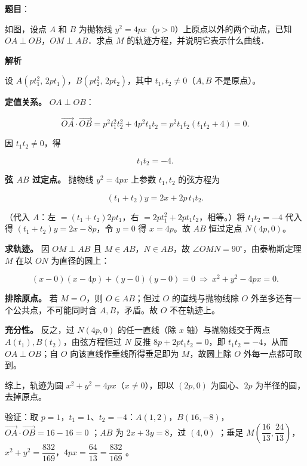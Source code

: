 \begin{answer}

\textbf{题目}：

如图，设点 $A$ 和 $B$ 为抛物线 $y^2 = 4px$（$p > 0$）上原点以外的两个动点，已知 $OA \perp OB$，$OM \perp AB$．求点 $M$ 的轨迹方程，并说明它表示什么曲线．
\nopagebreak[4]
\begin{center}\end{center}
\nopagebreak[4]
\textbf{解析}

设 $A\left(pt_1^2,\,2pt_1\right)$，$B\left(pt_2^2,\,2pt_2\right)$，其中 $t_1,t_2\ne0$（$A,B$ 不是原点）。

\textbf{定值关系。} $OA\perp OB$：

\nopagebreak[4]
\[\overrightarrow{OA}\cdot\overrightarrow{OB}=p^2t_1^2t_2^2+4p^2t_1t_2=p^2t_1t_2(t_1t_2+4)=0 .\]

因 $t_1t_2\ne0$，得

\nopagebreak[4]
\[t_1t_2=-4 .\]

\textbf{弦 $AB$ 过定点。} 抛物线 $y^2=4px$ 上参数 $t_1,t_2$ 的弦方程为

\nopagebreak[4]
\[(t_1+t_2)y=2x+2p\,t_1t_2 .\]

（代入 $A$：左 $=(t_1+t_2)2pt_1$，右 $=2pt_1^2+2pt_1t_2$，相等。）将 $t_1t_2=-4$ 代入得 $(t_1+t_2)y=2x-8p$，令 $y=0$ 得 $x=4p$。故 $AB$ 恒过定点 $N(4p,0)$。

\textbf{求轨迹。} 因 $OM\perp AB$ 且 $M\in AB$，$N\in AB$，故 $\angle OMN=90^\circ$，由泰勒斯定理 $M$ 在以 $ON$ 为直径的圆上：

\nopagebreak[4]
\[(x-0)(x-4p)+(y-0)(y-0)=0\ \Longrightarrow\ x^2+y^2-4px=0 .\]

\textbf{排除原点。} 若 $M=O$，则 $O\in AB$；但过 $O$ 的直线与抛物线除 $O$ 外至多还有一个公共点，不可能同时含 $A,B$，矛盾。故 $O$ 不在轨迹上。

\textbf{充分性。} 反之，过 $N(4p,0)$ 的任一直线（除 $x$ 轴）与抛物线交于两点 $A(t_1),B(t_2)$，由弦方程恒过 $N$ 反推 $8p+2pt_1t_2=0$，即 $t_1t_2=-4$，从而 $OA\perp OB$；自 $O$ 向该直线作垂线所得垂足即为 $M$，故圆上除 $O$ 外每一点都可取到。

综上，轨迹为圆 $x^2+y^2=4px$（$x\ne0$），即以 $(2p,0)$ 为圆心、$2p$ 为半径的圆，去掉原点。

验证：取 $p=1$，$t_1=1$、$t_2=-4$：$A(1,2)$，$B(16,-8)$，$\overrightarrow{OA}\cdot\overrightarrow{OB}=16-16=0$ ；$AB$ 为 $2x+3y=8$，过 $(4,0)$ ；垂足 $M\left(\dfrac{16}{13},\dfrac{24}{13}\right)$，$x^2+y^2=\dfrac{832}{169}$，$4px=\dfrac{64}{13}=\dfrac{832}{169}$ 。


\par\medskip

\end{answer}
